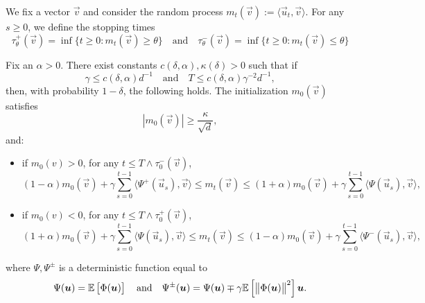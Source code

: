 We fix a vector $\vec{v}$ and consider the random process $m_t(\vec{v}) := \langle \vec{u}_t, \vec{v} \rangle$. For any $s \geq 0$, we define the stopping times
\[ \tau_\theta^+(\vec{v}) = \inf \{t \geq 0 : m_t(\vec{v}) \geq \theta \} \quad \text{and} \quad \tau_\theta^-(\vec{v}) = \inf \{t \geq 0 : m_t(\vec{v}) \leq \theta \}  \]
\begin{proposition}\label{2405:prop:app:diff_equation}
  Fix an $\alpha > 0$. There exist constants $c(\delta, \alpha), \kappa(\delta) > 0$ such that if
  \begin{equation}\label{2405:eq:app:bound_gamma_T}
    \gamma \leq c(\delta, \alpha)d^{-1} \quad \text{and} \quad T \leq c(\delta, \alpha) \gamma^{-2} d^{-1},
  \end{equation}
  then, with probability $1 - \delta$, the following holds. The initialization $m_0(\vec{v})$ satisfies
  \begin{equation}
    |m_0(\vec{v})| \geq \frac{\kappa}{\sqrt{d}},
  \end{equation}
  and:
  \begin{itemize}
    \item if $m_0(v) > 0$, for any $t \leq T \wedge \tau_0^-(\vec{v})$,
      \begin{equation}\label{2405:eq:app:diff_equation_positive}
        (1 - \alpha) m_0(\vec{v}) + \gamma\sum_{s=0}^{t-1} \langle \Psi^+(\vec{u}_s), \vec{v} \rangle \leq m_t(\vec{v}) \leq (1 + \alpha) m_0(\vec{v}) + \gamma\sum_{s=0}^{t-1} \langle \Psi(\vec{u}_s), \vec{v} \rangle,
      \end{equation}
    \item if $m_0(v) < 0$, for any $t \leq T \wedge \tau_0^+(\vec{v})$,
      \begin{equation}\label{2405:eq:app:diff_equation_negative}
        (1 + \alpha) m_0(\vec{v}) + \gamma\sum_{s=0}^{t-1} \langle \Psi(\vec{u}_s), \vec{v} \rangle \leq m_t(\vec{v}) \leq (1 - \alpha) m_0(\vec{v}) + \gamma\sum_{s=0}^{t-1} \langle \Psi^-(\vec{u}_s), \vec{v} \rangle,
      \end{equation}
  \end{itemize}
  where $\Psi, \Psi^{\pm}$ is a deterministic function equal to
  \[ \Psi({\boldsymbol{u}}) = \mathbb{E}\left[\Phi({\boldsymbol{u}})\right] \quad \text{and} \quad \Psi^{\pm}({\boldsymbol{u}}) = \Psi({\boldsymbol{u}}) \mp \gamma \mathbb{E}\left[\left\lVert \Phi({\boldsymbol{u}})\right\rVert^2\right]{\boldsymbol{u}}.\]
\end{proposition}

